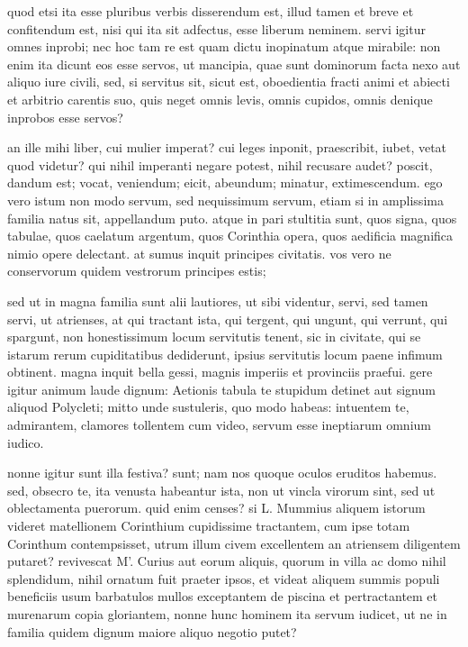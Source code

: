  quod etsi ita esse pluribus verbis disserendum est, illud tamen et breve et confitendum est, nisi qui ita sit adfectus, esse liberum neminem. servi igitur omnes inprobi; nec hoc tam re est quam dictu inopinatum atque mirabile: non enim ita dicunt eos esse servos, ut mancipia, quae sunt dominorum facta nexo aut aliquo iure civili, sed, si servitus sit, sicut est, oboedientia fracti animi et abiecti et arbitrio carentis suo, quis neget omnis levis, omnis cupidos, omnis denique inprobos esse servos?

 an ille mihi liber, cui mulier imperat? cui leges inponit, praescribit, iubet, vetat quod videtur? qui nihil imperanti negare potest, nihil recusare audet? poscit, dandum est; vocat, veniendum; eicit, abeundum; minatur, extimescendum. ego vero istum non modo servum, sed nequissimum servum, etiam si in amplissima familia natus sit, appellandum puto. atque in pari stultitia sunt, quos signa, quos tabulae, quos caelatum argentum, quos Corinthia opera, quos aedificia magnifica nimio opere delectant. at sumus inquit principes civitatis. vos vero ne conservorum quidem vestrorum principes estis;

 sed ut in magna familia sunt alii lautiores, ut sibi videntur, servi, sed tamen servi, ut atrienses, at qui tractant ista, qui tergent, qui ungunt, qui verrunt, qui spargunt, non honestissimum locum servitutis tenent, sic in civitate, qui se istarum rerum cupiditatibus dediderunt, ipsius servitutis locum paene infimum obtinent. magna inquit bella gessi, magnis imperiis et provinciis praefui. gere igitur animum laude dignum: Aetionis tabula te stupidum detinet aut signum aliquod Polycleti; mitto unde sustuleris, quo modo habeas: intuentem te, admirantem, clamores tollentem cum video, servum esse ineptiarum omnium iudico.

 nonne igitur sunt illa festiva? sunt; nam nos quoque oculos eruditos habemus. sed, obsecro te, ita venusta habeantur ista, non ut vincla virorum sint, sed ut oblectamenta puerorum. quid enim censes? si L. Mummius aliquem istorum videret matellionem Corinthium cupidissime tractantem, cum ipse totam Corinthum contempsisset, utrum illum civem excellentem an atriensem diligentem putaret? revivescat M'. Curius aut eorum aliquis, quorum in villa ac domo nihil splendidum, nihil ornatum fuit praeter ipsos, et videat aliquem summis populi beneficiis usum barbatulos mullos exceptantem de piscina et pertractantem et murenarum copia gloriantem, nonne hunc hominem ita servum iudicet, ut ne in familia quidem dignum maiore aliquo negotio putet?

